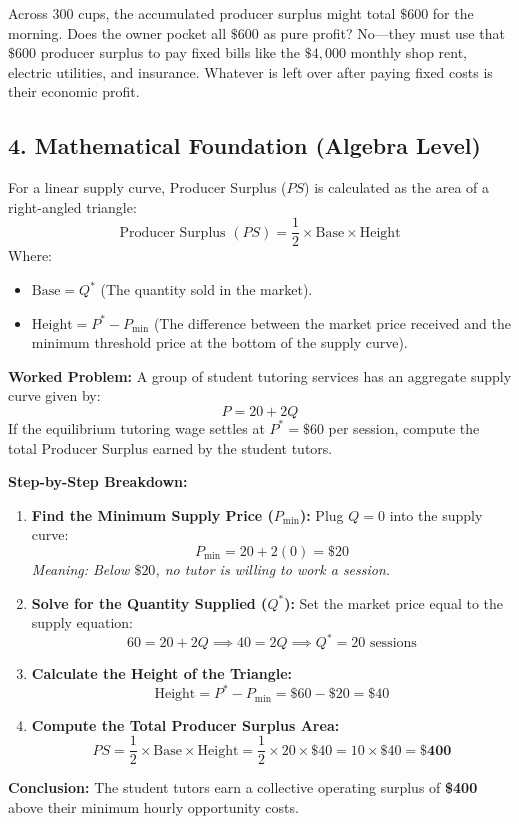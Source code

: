 \documentclass[11pt,letterpaper]{article}
\begin{document}
Across 300 cups, the accumulated producer surplus might total $\$600$ for the morning. Does the owner pocket all $\$600$ as pure profit? No—they must use that $\$600$ producer surplus to pay fixed bills like the $\$4,000$ monthly shop rent, electric utilities, and insurance. Whatever is left over after paying fixed costs is their economic profit.

\subsection*{4. Mathematical Foundation (Algebra Level)}
For a linear supply curve, Producer Surplus ($PS$) is calculated as the area of a right-angled triangle:
\begin{equation}
\text{Producer Surplus } (PS) = \frac{1}{2} \times \text{Base} \times \text{Height}
\end{equation}
Where:
\begin{itemize}
    \item $\text{Base} = Q^*$ (The quantity sold in the market).
    \item $\text{Height} = P^* - P_{\text{min}}$ (The difference between the market price received and the minimum threshold price at the bottom of the supply curve).
\end{itemize}

\noindent\textbf{Worked Problem:}
A group of student tutoring services has an aggregate supply curve given by:
\[
P = 20 + 2Q
\]
If the equilibrium tutoring wage settles at $P^* = \$60$ per session, compute the total Producer Surplus earned by the student tutors.

\noindent\textbf{Step-by-Step Breakdown:}
\begin{enumerate}
    \item \textbf{Find the Minimum Supply Price ($P_{\text{min}}$):} Plug $Q = 0$ into the supply curve:
    \[
    P_{\text{min}} = 20 + 2(0) = \$20
    \]
    \emph{Meaning: Below $\$20$, no tutor is willing to work a session.}
    
    \item \textbf{Solve for the Quantity Supplied ($Q^*$):} Set the market price equal to the supply equation:
    \[
    60 = 20 + 2Q \implies 40 = 2Q \implies Q^* = 20\text{ sessions}
    \]
    
    \item \textbf{Calculate the Height of the Triangle:}
    \[
    \text{Height} = P^* - P_{\text{min}} = \$60 - \$20 = \$40
    \]
    
    \item \textbf{Compute the Total Producer Surplus Area:}
    \[
    PS = \frac{1}{2} \times \text{Base} \times \text{Height} = \frac{1}{2} \times 20 \times \$40 = 10 \times \$40 = \mathbf{\$400}
    \]
\end{enumerate}
\textbf{Conclusion:} The student tutors earn a collective operating surplus of \textbf{\$400} above their minimum hourly opportunity costs.
\end{document}
